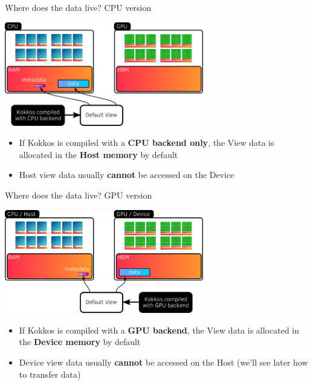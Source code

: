 \documentclass[aspectratio=169]{beamer}
\newcommand{\highlight}[1]{\textcolor{main}{\textbf{#1}}}
\begin{document}

\begin{frame}{Where does the data live? CPU version}
    \begin{center}
        \includegraphics[width=0.65\textwidth]{host_view_memory.png}
    \end{center}
    \begin{itemize}
        \item If Kokkos is compiled with a \highlight{CPU backend only}, the View data is allocated in the \highlight{Host memory} by default
        \item Host view data usually \highlight{cannot} be accessed on the Device
    \end{itemize}
\end{frame}


\begin{frame}{Where does the data live? GPU version}
    \begin{center}
        \includegraphics[width=0.65\textwidth]{device_view_memory.png}
    \end{center}
    \begin{itemize}
        \item If Kokkos is compiled with a \highlight{GPU backend}, the View data is allocated in the \highlight{Device memory} by default
        \item Device view data usually \highlight{cannot} be accessed on the Host (we'll see later how to transfer data)
    \end{itemize}
\end{frame}
\end{document}
